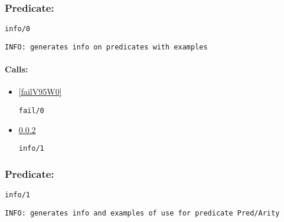 \subsubsection{Predicate:} \label{infoV95W0}

\begin{verbatim}
info/0
\end{verbatim}

{\small \begin{verbatim}
INFO: generates info on predicates with examples

\end{verbatim}}
\paragraph{Calls:} 
\begin{itemize}
\item \ref{failV95W0} 
\begin{verbatim}
fail/0
\end{verbatim}

\item \ref{infoV95W1} 
\begin{verbatim}
info/1
\end{verbatim}

\end{itemize}

\subsubsection{Predicate:} \label{infoV95W1}

\begin{verbatim}
info/1
\end{verbatim}

{\small \begin{verbatim}
INFO: generates info and examples of use for predicate Pred/Arity

\end{verbatim}}

